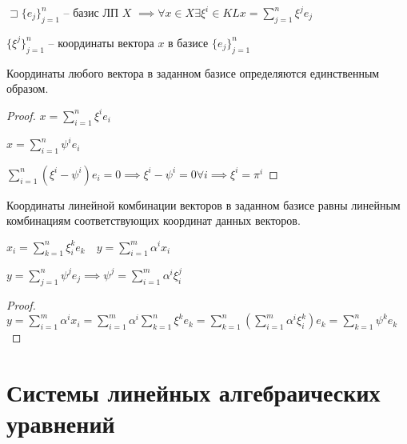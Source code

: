 \documentclass{book}
\theoremstyle{definition}
\begin{document}
\begin{definition}
    $\sqsupset \{e_j\}_{j=1}^n$ -- базис ЛП $X$  $\implies \forall x\in X \exists \xi^i\in KL x = \sum_{j=1}^{n} \xi^je_j$

    $\{\xi^j\}_{j=1}^n$ -- координаты вектора  $x$  в базисе  $\{e_j\}_{j=1}^n$
\end{definition}

\begin{lemma}
    Координаты любого вектора в заданном базисе определяются единственным образом.
\end{lemma}
\begin{proof}
    $x = \sum_{i=1}^{n} \xi^ie_i$ 

    $x = \sum_{i=1}^{n} \psi^ie_i$

    $\sum_{i=1}^{n} \left( \xi^i-\psi^i \right) e_i = 0 \implies  \xi^i-\psi^i = 0 \forall i \implies \xi^i = \pi^i$
\end{proof}

\begin{lemma}
    Координаты линейной комбинации векторов в заданном базисе равны линейным комбинациям соответствующих координат данных векторов.

    $x_i = \sum_{k=1}^{n} \xi_i^ke_k\quad y = \sum_{i=1}^{m} \alpha^ix_i$ 

    $y = \sum_{j=1}^{n} \psi^je_j \implies \psi^j = \sum_{i=1}^{m} \alpha^i\xi_i^j$
\end{lemma}
\begin{proof}
    $y = \sum_{i=1}^{m} \alpha^ix_i = \sum_{i=1}^{m} \alpha^i \sum_{k=1}^{n} \xi^ke_k = \sum_{k=1}^{n} \left( \sum_{i=1}^{m} \alpha^i\xi_i^k \right) e_k = \sum_{k=1}^{n} \psi^ke_k$
\end{proof}

\section{Системы линейных алгебраических уравнений}
\end{document}
